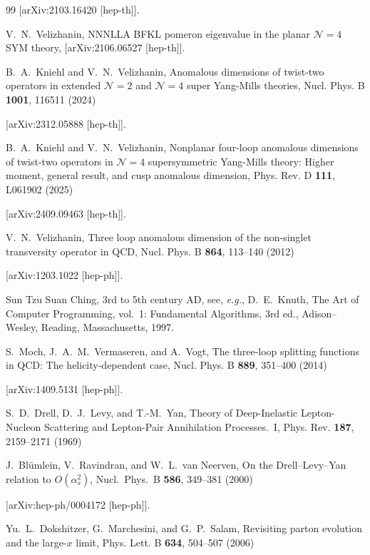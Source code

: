 \documentclass[
 twocolumn,
 superscriptaddress,
 preprintnumbers,
 nofootinbib,
 amsmath,amssymb,
 aps,
 prl
 ]{revtex4-2}
\begin{document}
\begin{thebibliography}{99}
[arXiv:2103.16420 [hep-th]].



V.~N.~Velizhanin,
NNNLLA BFKL pomeron eigenvalue in the planar $\mathcal{N}=4$ SYM theory,
[arXiv:2106.06527 [hep-th]].



B.~A.~Kniehl and V.~N.~Velizhanin,
Anomalous dimensions of twist-two operators in extended $\mathcal{N}=2$ and $\mathcal{N}=4$ super Yang-Mills theories,
Nucl. Phys. B \textbf{1001}, 116511 (2024)

[arXiv:2312.05888 [hep-th]].



B.~A.~Kniehl and V.~N.~Velizhanin,
Nonplanar four-loop anomalous dimensions of twist-two operators in $\mathcal{N}=4$ supersymmetric Yang-Mills theory: Higher moment, general result, and cusp anomalous dimension,
Phys. Rev. D \textbf{111}, L061902 (2025)

[arXiv:2409.09463 [hep-th]].



V.~N.~Velizhanin,
Three loop anomalous dimension of the non-singlet transversity operator in QCD,
Nucl. Phys. B \textbf{864}, 113--140 (2012)

[arXiv:1203.1022 [hep-ph]].


 Sun Tzu Suan Ching, 3rd to 5th century AD, see, {\it e.g.}, D.~E.~Knuth, The Art of Computer Programming, vol.~1: Fundamental Algorithms, 3rd ed., Adison--Wesley, Reading, Massachusetts, 1997.


S.~Moch, J.~A.~M.~Vermaseren, and A.~Vogt,
The three-loop splitting functions in QCD: The helicity-dependent case,
Nucl. Phys. B \textbf{889}, 351--400 (2014)

[arXiv:1409.5131 [hep-ph]].



S.~D.~Drell, D.~J.~Levy, and T.-M.~Yan,
Theory of Deep-Inelastic Lepton-Nucleon Scattering and Lepton-Pair Annihilation Processes.~I,
Phys. Rev. \textbf{187}, 2159--2171 (1969)



J.~Bl\"umlein, V.~Ravindran, and W.~L.~van Neerven,
On the Drell--Levy--Yan relation to $O(\alpha_s^2)$,
Nucl.\ Phys.\ B \textbf{586}, 349--381 (2000)

[arXiv:hep-ph/0004172 [hep-ph]].


Yu.~L.~Dokshitzer, G.~Marchesini, and G.~P.~Salam,
Revisiting parton evolution and the large-$x$ limit,
Phys. Lett. B \textbf{634}, 504--507 (2006)


\end{thebibliography}
\end{document}
